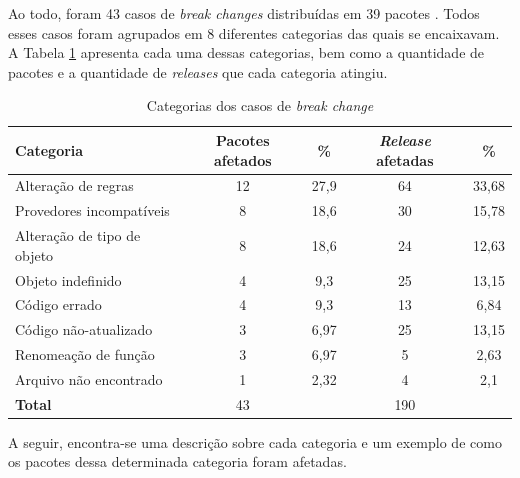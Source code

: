 Ao todo, foram 43 casos de \textit{break changes} distribuídas em 39 pacotes . Todos esses casos foram agrupados em 8 diferentes categorias das quais se encaixavam. A Tabela \ref{tab:bc_category} apresenta cada uma dessas categorias, bem como a quantidade de pacotes e a quantidade de \textit{releases} que cada categoria atingiu.

\begin{table}[]
\begin{tabular}{|l|c|c|c|c|}
\hline
\centering
\textbf{Categoria}           & \textbf{Pacotes afetados} & \textbf{\%}   & \textbf{\textit{Release} afetadas} & \textbf{\%}    \\ \hline
Alteração de regras          & 12              & 27,9 & 64                          & 33,68 \\
Provedores incompatíveis     & 8               & 18,6 & 30                          & 15,78 \\
Alteração de tipo de objeto  & 8               & 18,6 & 24                          & 12,63 \\
Objeto indefinido            & 4               & 9,3  & 25                          & 13,15 \\
Código errado                & 4               & 9,3  & 13                          & 6,84  \\
Código não-atualizado        & 3               & 6,97 & 25                          & 13,15  \\
Renomeação de função         & 3               & 6,97 & 5                           & 2,63  \\
Arquivo não encontrado       & 1               & 2,32 & 4                           & 2,1  \\ \hline
\textbf{Total}               & 43              &      & 190                         &       \\ \hline
\end{tabular}
\caption{Categorias dos casos de \textit{break change}}
\label{tab:bc_category}
\end{table}
A seguir, encontra-se uma descrição sobre cada categoria e um exemplo de como os pacotes dessa determinada categoria foram afetadas.

